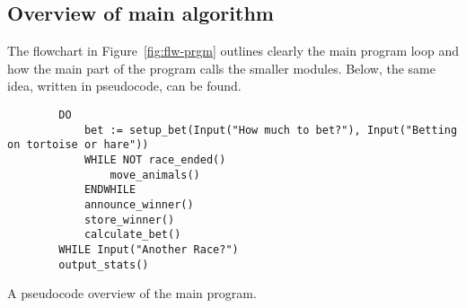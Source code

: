 \documentclass[11pt]{article}
\begin{document}
    \subsection{Overview of main algorithm}
    The flowchart in Figure~\ref{fig:flw-prgm} outlines clearly the main program loop and how the main
    part of the program calls the smaller modules. Below, the same idea, written in pseudocode, can be found.
    \begin{listing}
        \begin{verbatim}
        DO
            bet := setup_bet(Input("How much to bet?"), Input("Betting on tortoise or hare"))
            WHILE NOT race_ended()
                move_animals()
            ENDWHILE
            announce_winner()
            store_winner()
            calculate_bet()
        WHILE Input("Another Race?")
        output_stats()
        \end{verbatim}
        \caption{A pseudocode overview of the main program.}
        \label{lst:psd-overview}
    \end{listing}
\end{document}
